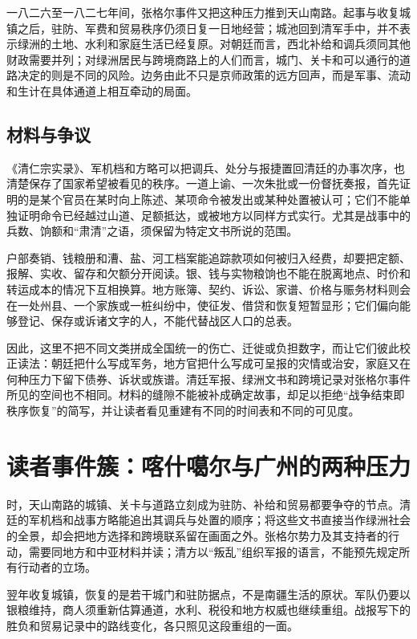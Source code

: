 一八二六至一八二七年间，张格尔事件又把这种压力推到天山南路。起事与收复城镇之后，驻防、军费和贸易秩序仍须日复一日地经营；城池回到清军手中，并不表示绿洲的土地、水利和家庭生活已经复原。对朝廷而言，西北补给和调兵须同其他财政需要并列；对绿洲居民与跨境商路上的人们而言，城门、关卡和可以通行的道路决定的则是不同的风险。边务由此不只是京师政策的远方回声，而是军事、流动和生计在具体通道上相互牵动的局面。

\subsection{材料与争议}

《清仁宗实录》、军机档和方略可以把调兵、处分与报捷置回清廷的办事次序，也清楚保存了国家希望被看见的秩序。一道上谕、一次朱批或一份督抚奏报，首先证明的是某个官员在某时向上陈述、某项命令被发出或某种处置被认可；它们不能单独证明命令已经越过山道、足额抵达，或被地方以同样方式实行。尤其是战事中的兵数、饷额和“肃清”之语，须保留为特定文书所说的范围。

户部奏销、钱粮册和漕、盐、河工档案能追踪款项如何被归入经费，却要把定额、报解、实收、留存和欠额分开阅读。银、钱与实物粮饷也不能在脱离地点、时价和转运成本的情况下互相换算。地方账簿、契约、诉讼、家谱、价格与赈务材料则会在一处州县、一个家族或一桩纠纷中，使征发、借贷和恢复短暂显形；它们偏向能够登记、保存或诉诸文字的人，不能代替战区人口的总表。

因此，这里不把不同文类拼成全国统一的伤亡、迁徙或负担数字，而让它们彼此校正读法：朝廷把什么写成军务，地方官把什么写成可呈报的灾情或治安，家庭又在何种压力下留下债券、诉状或族谱。清廷军报、绿洲文书和跨境记录对张格尔事件所见的空间也不相同。材料的缝隙不能被补成确定故事，却足以拒绝“战争结束即秩序恢复”的简写，并让读者看见重建有不同的时间表和不同的可见度。

\section{读者事件簇：喀什噶尔与广州的两种压力}

时，天山南路的城镇、关卡与道路立刻成为驻防、补给和贸易都要争夺的节点。清廷的军机档和战事方略能追出其调兵与处置的顺序；将这些文书直接当作绿洲社会的全景，却会把地方选择和跨境联系留在画面之外。张格尔势力及其支持者的行动，需要同地方和中亚材料并读；清方以“叛乱”组织军报的语言，不能预先规定所有行动者的立场。

翌年收复城镇，恢复的是若干城门和驻防据点，不是南疆生活的原状。军队仍要以银粮维持，商人须重新估算通道，水利、税役和地方权威也继续重组。战报写下的胜负和贸易记录中的路线变化，各只照见这段重组的一面。

